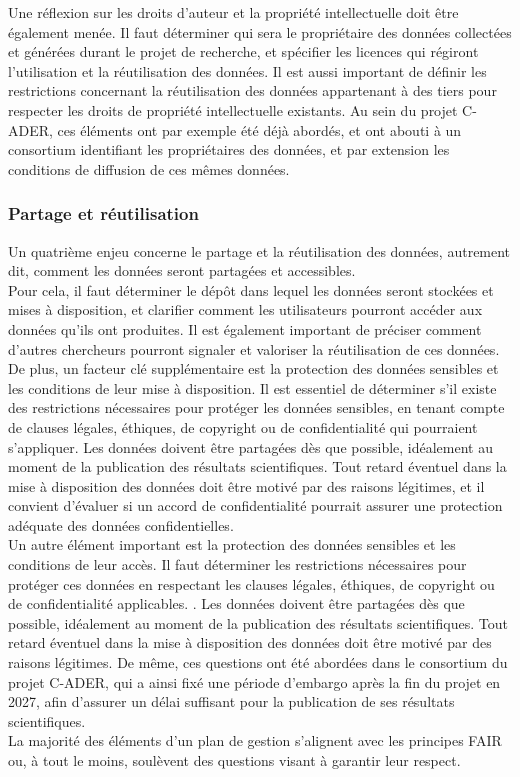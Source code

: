 Une réflexion sur les droits d'auteur et la propriété intellectuelle doit être également menée. Il faut déterminer qui sera le propriétaire des données collectées et générées durant le projet de recherche, et spécifier les licences qui régiront l’utilisation et la réutilisation des données. Il est aussi important de définir les restrictions concernant la réutilisation des données appartenant à des tiers pour respecter les droits de propriété intellectuelle existants. Au sein du projet C-ADER, ces éléments ont par exemple été déjà abordés, et ont abouti à un consortium identifiant les propriétaires des données, et par extension les conditions de diffusion de ces mêmes données.

            \subsubsection{Partage et réutilisation}

Un quatrième enjeu concerne le partage et la réutilisation des données, autrement dit, comment les données seront partagées et accessibles.\\

Pour cela, il faut déterminer le dépôt dans lequel les données seront stockées et mises à disposition, et clarifier comment les utilisateurs pourront accéder aux données qu’ils ont produites. Il est également important de préciser comment d'autres chercheurs pourront signaler et valoriser la réutilisation de ces données.\\

De plus, un facteur clé supplémentaire est la protection des données sensibles et les conditions de leur mise à disposition. Il est essentiel de déterminer s'il existe des restrictions nécessaires pour protéger les données sensibles, en tenant compte de clauses légales, éthiques, de copyright ou de confidentialité qui pourraient s'appliquer. Les données doivent être partagées dès que possible, idéalement au moment de la publication des résultats scientifiques. Tout retard éventuel dans la mise à disposition des données doit être motivé par des raisons légitimes, et il convient d'évaluer si un accord de confidentialité pourrait assurer une protection adéquate des données confidentielles.\\

Un autre élément important est la protection des données sensibles et les conditions de leur accès. Il faut déterminer les restrictions nécessaires pour protéger ces données en respectant les clauses légales, éthiques, de copyright ou de confidentialité applicables. . Les données doivent être partagées dès que possible, idéalement au moment de la publication des résultats scientifiques. Tout retard éventuel dans la mise à disposition des données doit être motivé par des raisons légitimes. De même, ces questions ont été abordées dans le consortium du projet C-ADER, qui a ainsi fixé une période d’embargo après la fin du projet en 2027, afin d’assurer un délai suffisant pour la publication de ses résultats scientifiques.\\

La majorité des éléments d’un plan de gestion s’alignent avec les principes FAIR ou, à tout le moins, soulèvent des questions visant à garantir leur respect.